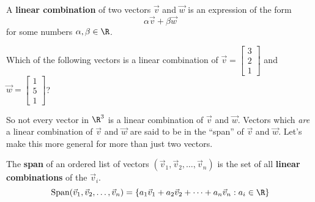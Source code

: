 \documentclass{ximera}
\begin{document}
\begin{question}
  A \textbf{linear combination} of two vectors $\vec{v}$ and $\vec{w}$ is an expression of the form
  $$
  \alpha \vec{v} + \beta \vec{w}
  $$
  for some numbers $\alpha, \beta \in \R$.
  
  Which of the following vectors is a linear combination of $\vec{v} = \begin{bmatrix} 3 \\ 2 \\ 1 \end{bmatrix}$ and $\vec{w} = \begin{bmatrix} 1 \\ 5 \\ 1\end{bmatrix}$?
    
  \begin{solution}
    \begin{multiple-choice}
    \end{multiple-choice}
  \end{solution}

  So not every vector in $\R^3$ is a linear combination of $\vec{v}$
  and $\vec{w}$.  Vectors which \textit{are} a linear combination of
  $\vec{v}$ and $\vec{w}$ are said to be in the ``span'' of $\vec{v}$
  and $\vec{w}$.  Let's make this more general for more than just two
  vectors.

\end{question}

\begin{definition}
  The \textbf{span} of an ordered list of vectors $(\vec{v}_1,\vec{v}_2, \ldots,\vec{v}_n)$ is the set of all \textbf{linear combinations} of the $\vec{v}_i$.
  \[\textrm{Span}(\vec{v}_1,\vec{v}_2, \ldots,\vec{v}_n) = \{a_1\vec{v}_1+a_2\vec{v}_2+ \cdots +a_n\vec{v}_n: a_i \in \R\}\]
\end{definition}

 
\end{document}
